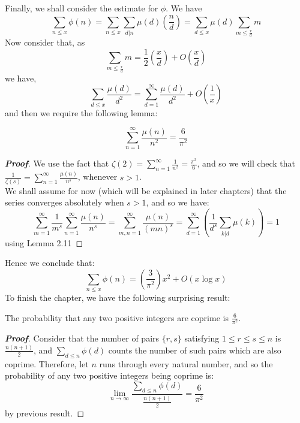 Finally, we shall consider the estimate for $\phi$. We have
\begin{equation*} \sum_{n \le x}\phi(n)=\sum_{n \le x} \sum_{d|n} \mu(d) \left(\frac{n}{d}\right) =\sum_{d \le x}\mu(d) \sum_{m \le \frac{x}{d}} m
\end{equation*}
Now consider that, as
\begin{equation*} \sum_{m \le \frac{x}{d}} m = \frac{1}{2}\left(\frac{x}{d}\right) + O\left(\frac{x}{d}\right)
\end{equation*}
we have,
\begin{equation*} \sum_{d \le x}\frac{\mu(d)}{d^2}=\sum_{d=1}^{\infty} \frac{\mu(d)}{d^2}+O\left(\frac{1}{x}\right)
\end{equation*}
and then we require the following lemma:
\begin{lemma} \begin{equation*} \sum_{n=1}^{\infty}\frac{\mu(n)}{n^2}=\frac{6}{\pi^2} \end{equation*}
\end{lemma}
\begin{proof}[\bf Proof] We use the fact that $\zeta(2)=\sum_{n=1}^{\infty}\frac{1}{n^2}=\frac{\pi^2}{6}$, and so we will check that $\frac{1}{\zeta(s)}=\sum_{n=1}^{\infty}\frac{\mu(n)}{n^s}$, whenever $s>1$.\\
We shall assume for now (which will be explained in later chapters) that the series converges absolutely when $s>1$, and so we have:
\begin{equation*}
\sum_{m=1}^{\infty}\frac{1}{m^s} \sum_{n=1}^{\infty}\frac{\mu(n)}{n^s} = \sum_{m,n=1}^{\infty} \frac{\mu(n)}{(mn)^s}=\sum_{d=1}^{\infty}\left(\frac{1}{d^s} \sum_{k|d}\mu(k)\right)=1
\end{equation*}
using Lemma 2.11
\end{proof}
Hence we conclude that:
\begin{equation*} \sum_{n \le x}\phi(n)=\left(\frac{3}{\pi^2}\right) x^2 + O(x \log{x})
\end{equation*}
To finish the chapter, we have the following surprising result:
\begin{corollary} The probability that any two positive integers are coprime is $\frac{6}{\pi^2}$.
\end{corollary}
\begin{proof}[\bf Proof] Consider that the number of pairs $\{r,s\}$ satisfying $1 \le r \le s \le n$ is $\frac{n(n+1)}{2}$, and $\sum_{d \le n} \phi(d)$ counts the number of such pairs which are also coprime.
Therefore, let $n$ runs through every natural number, and so the probability of any two positive integers being coprime is:
\begin{equation*}
\lim_{n \to \infty} \frac{\sum_{d \le n}\phi(d)}{\frac{n(n+1)}{2}} = \frac{6}{\pi^2}
\end{equation*}
by previous result.
\end{proof}
